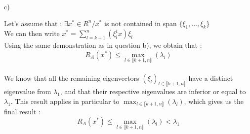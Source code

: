 \documentclass[12pt,a4paper]{report} %
\begin{document}
\item c)

Let's assume that : $\exists x^* \in R^n /x^*$ is not contained in span $\{\xi_1, ..., \xi_k\}$\\

We can then write $x^*=\sum_{l=k+1}^n(\xi_l^tx)\xi_l$\\

Using the same demonstration as in question b), we obtain that : \\
\[
R_A(x^*) \leq \max_{l\in \llbracket k+1, n \rrbracket}(\lambda_l)
\] \\

We know that all the remaining eigenvectors $(\xi_l)_{l\in \llbracket k+1, n \rrbracket}$ have a distinct eigenvalue from $\lambda_1$, and that their respective eigenvalues are inferior or equal to $\lambda_1$. This result applies in particular to $\max_{l\in \llbracket k+1, n \rrbracket}(\lambda_l)$, which gives us the final result : \\

\[
R_A(x^*) \leq \max_{l\in \llbracket k+1, n \rrbracket}(\lambda_l) < \lambda_1
\] \\
\end{document}
